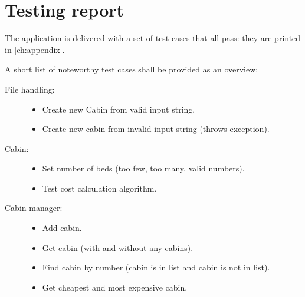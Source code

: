 \chapter{Testing report}\label{ch:testing_report} %

The application is delivered with a set of test cases that all pass: they are printed in \autoref{ch:appendix}.

A short list of noteworthy test cases shall be provided as an overview:

\begin{description}
\item[File handling:] 

\begin{itemize}
\item Create new Cabin from valid input string.
\item Create new cabin from invalid input string (throws exception).
\end{itemize}
\item[Cabin:]

\begin{itemize}
\item Set number of beds (too few, too many, valid numbers).
\item Test cost calculation algorithm.
\end{itemize}
\item[Cabin manager:]

\begin{itemize}
\item Add cabin.
\item Get cabin (with and without any cabins).
\item Find cabin by number (cabin is in list and cabin is not in list).
\item Get cheapest and most expensive cabin.
\end{itemize}
\end{description}